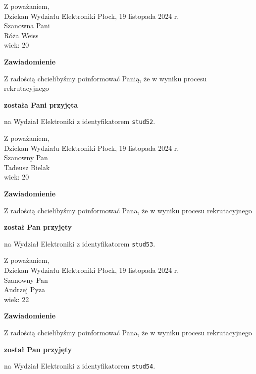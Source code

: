 \documentclass[12pt,a4paper]{article}
\begin{document}
\noindent
Z poważaniem,\\
Dziekan
Wydziału Elektroniki
\newpage
\hfill Płock, 19 listopada 2024 r.\\ 
\noindent 
Szanowna Pani \\
Róża Weiss \\
wiek: 20

\bigskip

\begin{center}
{\Large\textbf{Zawiadomienie}}
\end{center}
\bigskip
Z radością chcielibyśmy poinformować Panią, że w wyniku procesu rekrutacyjnego
\begin{center}
\textsf{\textbf{została Pani przyjęta}} 
\end{center}
na Wydział Elektroniki z identyfikatorem \verb|stud52|.
\vspace{2cm}

\noindent
Z poważaniem,\\
Dziekan
Wydziału Elektroniki
\newpage
\hfill Płock, 19 listopada 2024 r.\\ 
\noindent 
Szanowny Pan \\
Tadeusz Bielak \\
wiek: 20

\bigskip

\begin{center}
{\Large\textbf{Zawiadomienie}}
\end{center}
\bigskip
Z radością chcielibyśmy poinformować Pana, że w wyniku procesu rekrutacyjnego
\begin{center}
\textsf{\textbf{został Pan przyjęty}} 
\end{center}
na Wydział Elektroniki z identyfikatorem \verb|stud53|.
\vspace{2cm}

\noindent
Z poważaniem,\\
Dziekan
Wydziału Elektroniki
\newpage
\hfill Płock, 19 listopada 2024 r.\\ 
\noindent 
Szanowny Pan \\
Andrzej Pyza \\
wiek: 22

\bigskip

\begin{center}
{\Large\textbf{Zawiadomienie}}
\end{center}
\bigskip
Z radością chcielibyśmy poinformować Pana, że w wyniku procesu rekrutacyjnego
\begin{center}
\textsf{\textbf{został Pan przyjęty}} 
\end{center}
na Wydział Elektroniki z identyfikatorem \verb|stud54|.
\vspace{2cm}
\end{document}

